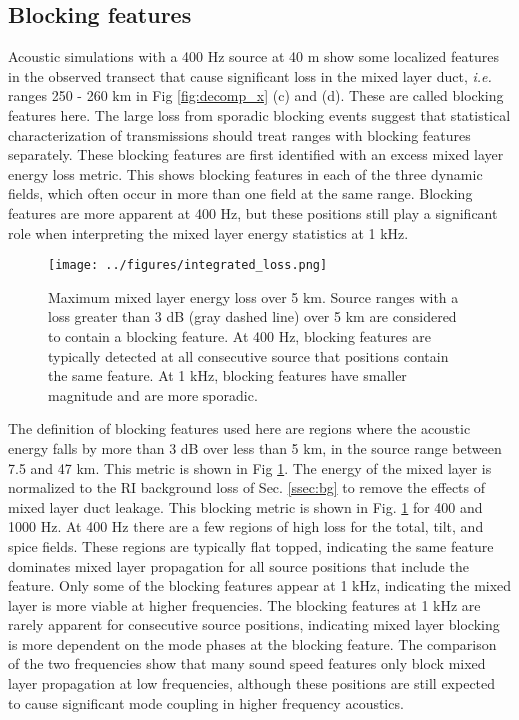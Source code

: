 \documentclass[preprint,NumberedRefs]{JASA}
\begin{document}
\subsection{Blocking features}
Acoustic simulations with a 400 Hz source at 40 m show some localized features in the observed transect that cause significant loss in the mixed layer duct, \emph{i.e.} ranges 250 - 260 km in Fig \ref{fig:decomp_x} (c) and (d). These are called blocking features here. The large loss from sporadic blocking events suggest that statistical characterization of transmissions should treat ranges with blocking features separately. These blocking features are first identified with an excess mixed layer energy loss metric. This shows blocking features in each of the three dynamic fields, which often occur in more than one field at the same range. Blocking features are more apparent at 400 Hz, but these positions still play a significant role when interpreting the mixed layer energy statistics at 1 kHz.

\begin{figure}
\texttt{[image: ../figures/integrated\_loss.png]}
    \caption{Maximum mixed layer energy loss over 5 km. Source ranges with a loss greater than 3 dB (gray dashed line) over 5 km are considered to contain a blocking feature. At 400 Hz, blocking features are typically detected at all consecutive source that positions contain the same feature. At 1 kHz, blocking features have smaller magnitude and are more sporadic.}
    \label{fig:blocking}
\end{figure}

The definition of blocking features used here are regions where the acoustic energy falls by more than 3 dB over less than 5 km, in the source range between 7.5 and 47 km. This metric is shown in Fig \ref{fig:blocking}. The energy of the mixed layer is normalized to the RI background loss of Sec. \ref{ssec:bg} to remove the effects of mixed layer duct leakage. This blocking metric is shown in Fig. \ref{fig:blocking} for 400 and 1000 Hz. At 400 Hz there are a few regions of high loss for the total, tilt, and spice fields. These regions are typically flat topped, indicating the same feature dominates mixed layer propagation for all source positions that include the feature. Only some of the blocking features appear at 1 kHz, indicating the mixed layer is more viable at higher frequencies. The blocking features at 1 kHz are rarely apparent for consecutive source positions, indicating mixed layer blocking is more dependent on the mode phases at the blocking feature. The comparison of the two frequencies show that many sound speed features only block mixed layer propagation at low frequencies, although these positions are still expected to cause significant mode coupling in higher frequency acoustics.
\end{document}
